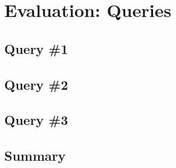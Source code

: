 {\chapter{Evaluation: Queries}
\label{chap:Eval_6}


\section{Query \#1}


\section{Query \#2}


\section{Query \#3}


\section{Summary}
}